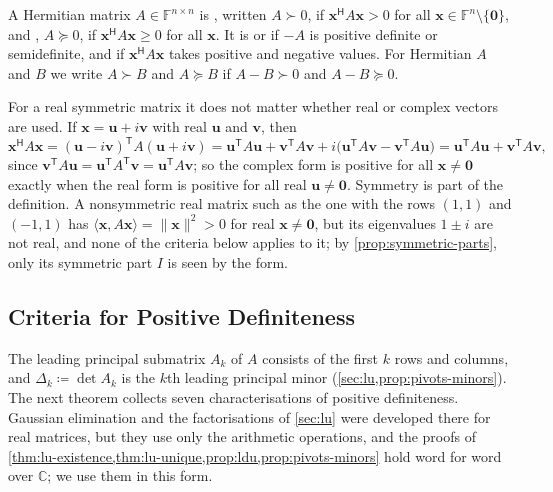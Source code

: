 \begin{definition}
\label{def:hermitian-definite}
A Hermitian matrix $A\in\mathbb F^{n\times n}$ is , written $A\succ0$, if $\mathbf x^{\mathsf H}A\mathbf x>0$ for all $\mathbf x\in\mathbb F^n\setminus\{\mathbf 0\}$, and , $A\succeq0$, if $\mathbf x^{\mathsf H}A\mathbf x\ge0$ for all $\mathbf x$. It is  or  if $-A$ is positive definite or semidefinite, and  if $\mathbf x^{\mathsf H}A\mathbf x$ takes positive and negative values. For Hermitian $A$ and $B$ we write $A\succ B$ and $A\succeq B$ if $A-B\succ0$ and $A-B\succeq0$.
\end{definition}

For a real symmetric matrix it does not matter whether real or complex vectors are used. If $\mathbf x=\mathbf u+i\mathbf v$ with real $\mathbf u$ and $\mathbf v$, then
\[
\mathbf x^{\mathsf H}A\mathbf x=(\mathbf u-i\mathbf v)^{\mathsf T}A(\mathbf u+i\mathbf v)=\mathbf u^{\mathsf T}A\mathbf u+\mathbf v^{\mathsf T}A\mathbf v+i\bigl(\mathbf u^{\mathsf T}A\mathbf v-\mathbf v^{\mathsf T}A\mathbf u\bigr)=\mathbf u^{\mathsf T}A\mathbf u+\mathbf v^{\mathsf T}A\mathbf v ,
\]
since $\mathbf v^{\mathsf T}A\mathbf u=\mathbf u^{\mathsf T}A^{\mathsf T}\mathbf v=\mathbf u^{\mathsf T}A\mathbf v$; so the complex form is positive for all $\mathbf x\ne\mathbf 0$ exactly when the real form is positive for all real $\mathbf u\ne\mathbf 0$. Symmetry is part of the definition. A nonsymmetric real matrix such as the one with the rows $(1,1)$ and $(-1,1)$ has $\langle\mathbf x,A\mathbf x\rangle=\|\mathbf x\|^2>0$ for real $\mathbf x\ne\mathbf 0$, but its eigenvalues $1\pm i$ are not real, and none of the criteria below applies to it; by \cref{prop:symmetric-parts}, only its symmetric part $I$ is seen by the form.

\subsection{Criteria for Positive Definiteness}

The leading principal submatrix $A_k$ of $A$ consists of the first $k$ rows and columns, and $\Delta_k\coloneqq\det A_k$ is the $k$th leading principal minor (\cref{sec:lu,prop:pivots-minors}). The next theorem collects seven characterisations of positive definiteness. Gaussian elimination and the factorisations of \cref{sec:lu} were developed there for real matrices, but they use only the arithmetic operations, and the proofs of \cref{thm:lu-existence,thm:lu-unique,prop:ldu,prop:pivots-minors} hold word for word over $\mathbb C$; we use them in this form.

